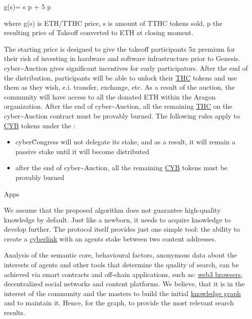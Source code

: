 \documentclass[8pt,oneside]{amsart}
\makeatletter
\newcommand{\linkgreen}[2]{\href{#1}{\color{green}{#2}}}
\renewcommand\subsection{\@startsection{subsection}
                                    {2}{\z@}
                                    {-3.25ex\@plus -1ex \@minus -.2ex}
                                    {0ex \@plus .2ex}
                                    {\play\Large}
                        }
\newcommand{\titleSection}[1]{\subsection{#1}}
\makeatother
\begin{document}
$$g(s)= \cdot s \cdot p + 5 \cdot p

where g(s) is ETH/TTHC price, s is amount of TTHC tokens sold, p the resulting price of Takeoff converted to ETH at closing moment.

The starting price is designed to give the takeoff participants 5x premium for their risk of investing in hardware and software infrastructure prior to Genesis. cyber\~{}Auction gives significant incentives for early participators. After the end of the distribution, participants will be able to unlock their {\hyperref[thc]{THC}} tokens and use them as they wish, e.i. transfer, exchange, etc. As a result of the auction, the community will have access to all the donated ETH within the Aragon organization. After the end of cyber\~{}Auction, all the remaining {\hyperref[thc]{THC}} on the cyber\~{}Auction contract must be provably burned. The following rules apply to {\hyperref[cyb]{CYB}} tokens under the \linkgreen{https://cyber.page/network/cyber/contract/cyber147drnke9676972jr3anklkj7pzgwjw47cp2u7j}{multisig for distribution}:

\begin{itemize}
\item cyber\~Congress will not delegate its stake, and as a result, it will remain a passive stake until it will become distributed
\item after the end of cyber\~{}Auction, all the remaining {\hyperref[cyb]{CYB}} tokens must be provably burned
\end{itemize}

\titleSection{Apps}\label{apps}

We assume that the proposed algorithm does not guarantee high-quality knowledge by default. Just like a newborn, it needs to acquire knowledge to develop further. The protocol itself provides just one simple tool: the ability to create a {\hyperref[cyberlinks]{cyberlink}} with an agents stake between two content addresses.

Analysis of the semantic core, behavioural factors, anonymous data about the interests of agents and other tools that determine the quality of search, can be achieved via smart contracts and off-chain applications, such as: {\hyperref[browzers]{web3 browsers}}, decentralized social networks and content platforms. We believe, that it is in the interest of the community and the masters to build the initial {\hyperref[knowledge-graph]{knowledge graph}} and to maintain it. Hence, for the graph, to provide the most relevant search results.
\end{document}
